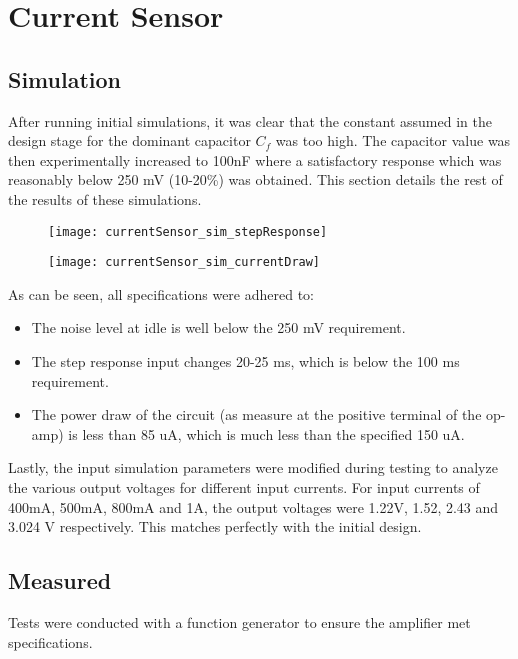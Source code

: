 \graphicspath{{content/3_results/figures}}
\section{Current Sensor}

\subsection{Simulation}

After running initial simulations, it was clear that the constant assumed in the design stage for the dominant capacitor $C_f$ was too high. The capacitor value was then experimentally
increased to 100nF where a satisfactory response which was reasonably below 250 mV (10-20\%) was obtained. This section details the rest of the results of these simulations.

\begin{figure}[h!]
   \centering
   \texttt{[image: currentSensor\_sim\_stepResponse]}
   \label{fig:simulation response}
\end{figure}

\begin{figure}[h!]
   \centering
   \texttt{[image: currentSensor\_sim\_currentDraw]}
   \label{fig:simulation_current}
\end{figure}

As can be seen, all specifications were adhered to:
\begin{itemize}
   \item The noise level at idle is well below the 250 mV requirement.
   \item The step response input changes 20-25 ms, which is below the 100 ms requirement.
   \item The power draw of the circuit (as measure at the positive terminal of the op-amp) is less than 85 uA, which is much less than the specified 150 uA.
\end{itemize}

Lastly, the input simulation parameters were modified during testing to analyze the various output voltages for different input currents. For input currents of 400mA, 500mA, 800mA and 1A,
the output voltages were 1.22V, 1.52, 2.43 and 3.024 V respectively. This matches perfectly with the initial design.

\subsection{Measured}
Tests were conducted with a function generator to ensure the amplifier met specifications.

